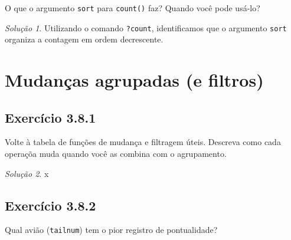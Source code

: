 \documentclass[
]{latex/krantz}
\theoremstyle{definition}
\theoremstyle{definition}
\theoremstyle{definition}
\theoremstyle{definition}
\theoremstyle{remark}
\newtheorem*{solution}{Solução}
\begin{document}
O que o argumento \texttt{sort} para \texttt{count()} faz? Quando você pode usá-lo?

\begin{solution}
Utilizando o comando \texttt{?count}, identificamos que o argumento \texttt{sort} organiza a contagem em ordem decrescente.
\end{solution}

\hypertarget{mudanuxe7as-agrupadas-e-filtros}{%
\section{Mudanças agrupadas (e filtros)}\label{mudanuxe7as-agrupadas-e-filtros}}

\hypertarget{exr3-8-1}{%
\subsection*{Exercício 3.8.1}\label{exr3-8-1}}

Volte à tabela de funções de mudança e filtragem úteis. Descreva como cada operaçõa muda quando você as combina com o agrupamento.

\begin{solution}
x
\end{solution}

\hypertarget{exr3-8-2}{%
\subsection*{Exercício 3.8.2}\label{exr3-8-2}}

Qual avião (\texttt{tailnum}) tem o pior registro de pontualidade?
\end{document}

